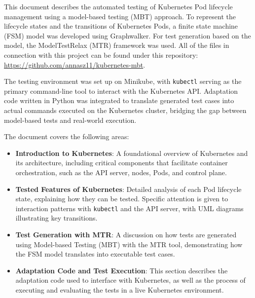 \documentclass[main.tex]{subfiles}
\begin{document}
This document describes the automated testing of Kubernetes Pod lifecycle management using a model-based testing (MBT) approach. To represent the lifecycle states and the transitions of Kubernetes Pods, a finite state machine (FSM) model was developed using Graphwalker. For test generation based on the model, the ModelTestRelax (MTR) framework was used. All of the files in connection with this project can be found under this repository: \url{https://github.com/annasz11/kubernetes-mbt}. 

The testing environment was set up on Minikube, with \texttt{kubectl} serving as the primary command-line tool to interact with the Kubernetes API. Adaptation code written in Python was integrated to translate generated test cases into actual commands executed on the Kubernetes cluster, bridging the gap between model-based tests and real-world execution.

The document covers the following areas:
\begin{itemize}
    \item \textbf{Introduction to Kubernetes}: A foundational overview of Kubernetes and its architecture, including critical components that facilitate container orchestration, such as the API server, nodes, Pods, and control plane.
    \item \textbf{Tested Features of Kubernetes}: Detailed analysis of each Pod lifecycle state, explaining how they can be tested. Specific attention is given to interaction patterns with \texttt{kubectl} and the API server, with UML diagrams illustrating key transitions.
    \item \textbf{Test Generation with MTR}: A discussion on how tests are generated using Model-based Testing (MBT) with the MTR tool, demonstrating how the FSM model translates into executable test cases.
    \item \textbf{Adaptation Code and Test Execution}: This section describes the adaptation code used to interface with Kubernetes, as well as the process of executing and evaluating the tests in a live Kubernetes environment.
\end{itemize}
\end{document}
